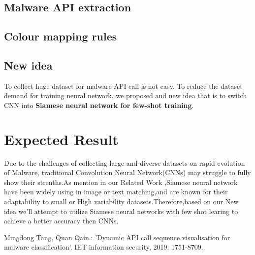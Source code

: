 \documentclass{article}
\begin{document}
\subsection{Malware API extraction}
\subsection{Colour mapping rules}
\subsection{New idea}
To collect huge dataset for malware API call is not easy. To reduce the dataset demand for training neural network, 
we proposed and new idea that is to switch CNN into \textbf{Siamese neural network for few-shot training}.



\section{Expected Result}
Due to the challenges of collecting large and diverse datasets on rapid evolution of Malware, traditional Convolution Neural Network(CNNs) may struggle to fully show their strenths.As mention in our Related Work ,Siamese neural network have been widely using in image or text matching,and are known for their adaptability to small or High variability datasets.Therefore,based on our New idea we'll attempt to utilize Siamese neural networks with few shot learing to achieve a better accuracy then CNNs.
\begin{thebibliography}{99}  
    Mingdong Tang, Quan Qain.: 'Dynamic API call sequence visualisation for malware classification'. IET information security, 2019: 1751-8709.  
\end{thebibliography}
\end{document}
